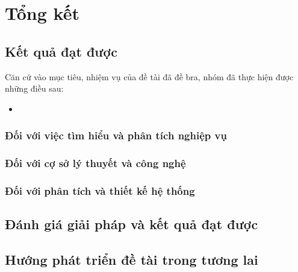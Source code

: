 \chapter{Tổng kết}
\section{Kết quả đạt được}
\noindent Căn cứ vào mục tiêu, nhiệm vụ của đề tài đã đề bra, nhóm đã thực hiện được những điều sau:
\begin{itemize}
    \item 
\end{itemize}
\subsection{Đối với việc tìm hiểu và phân tích nghiệp vụ}
\subsection{Đối với cợ sở lý thuyết và công nghệ}
\subsection{Đối với phân tích và thiết kế hệ thống}
\section{Đánh giá giải pháp và kết quả đạt được}
\section{Hướng phát triển đề tài trong tương lai}